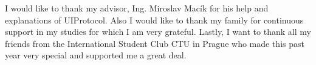 \startAcknowledgement
I would like to thank my advisor, Ing. Miroslav Macík for his help and explanations of UIProtocol. Also I would like to thank my family for continuous support in my studies for which I am very grateful. Lastly, I want to thank all my friends from the International Student Club CTU in Prague who made this past year very special and supported me a great deal.
\stopAcknowledgement

\endinput
